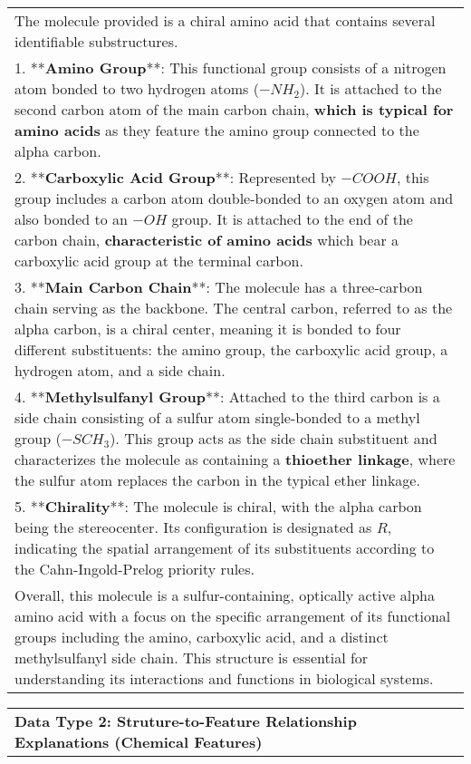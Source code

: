 \begin{table*}[h!]
\begin{tcolorbox}[colframe=gray,colback=white,boxrule=1pt,arc=0.6em,boxsep=0mm,left=5.pt,right=15pt]
\renewcommand{\arraystretch}{1.2}
\begin{tabular}{p{}}
    The molecule provided is a chiral amino acid that contains several identifiable substructures. \\
    1. **\textbf{Amino Group}**: This functional group consists of a nitrogen atom bonded to two hydrogen atoms (\(-NH_2\)). It is attached to the second carbon atom of the main carbon chain, \textbf{which is typical for amino acids} as they feature the amino group connected to the alpha carbon.\\
    2. **\textbf{Carboxylic Acid Group}**: Represented by \(-COOH\), this group includes a carbon atom double-bonded to an oxygen atom and also bonded to an \(-OH\) group. It is attached to the end of the carbon chain, \textbf{characteristic of amino acids} which bear a carboxylic acid group at the terminal carbon.\\
    3. **\textbf{Main Carbon Chain}**: The molecule has a three-carbon chain serving as the backbone. The central carbon, referred to as the alpha carbon, is a chiral center, meaning it is bonded to four different substituents: the amino group, the carboxylic acid group, a hydrogen atom, and a side chain.\\
    4. **\textbf{Methylsulfanyl Group}**: Attached to the third carbon is a side chain consisting of a sulfur atom single-bonded to a methyl group (\(-SCH_3\)). This group acts as the side chain substituent and characterizes the molecule as containing a \textbf{thioether linkage}, where the sulfur atom replaces the carbon in the typical ether linkage.\\
    5. **\textbf{Chirality}**: The molecule is chiral, with the alpha carbon being the stereocenter. Its configuration is designated as \(R\), indicating the spatial arrangement of its substituents according to the Cahn-Ingold-Prelog priority rules.\\
    Overall, this molecule is a sulfur-containing, optically active alpha amino acid with a focus on the specific arrangement of its functional groups including the amino, carboxylic acid, and a distinct methylsulfanyl side chain. This structure is essential for understanding its interactions and functions in biological systems.\\
    \cmidrule{1-1}
\end{tabular}

\renewcommand{\arraystretch}{1.4}
\begin{tabular}{p{}}
    \textcolor{figgreen}{\textbf{\normalsize{Data Type 2: Struture-to-Feature Relationship Explanations (Chemical Features)}}} \\
\end{tabular}


\end{tcolorbox}
\end{table*}
